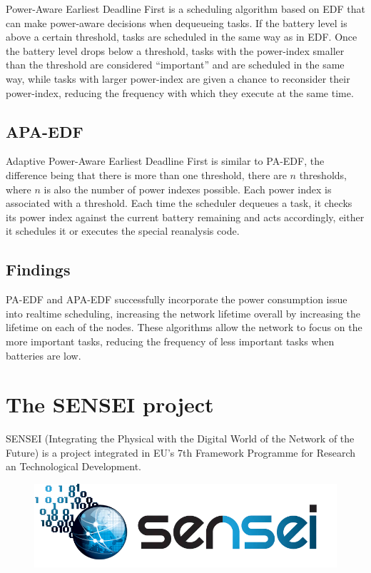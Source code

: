 Power-Aware Earliest Deadline First is a scheduling algorithm based on EDF that can make power-aware decisions when dequeueing tasks. If the battery level is above
a certain threshold, tasks are scheduled in the same way as in EDF. Once the battery level drops below a threshold, tasks with the power-index smaller than the 
threshold are considered ``important'' and are scheduled in the same way, while tasks with larger power-index are given a chance to reconsider their power-index,
reducing the frequency with which they execute at the same time.

\subsection{APA-EDF}

Adaptive Power-Aware Earliest Deadline First is similar to PA-EDF, the difference being that there is more than one threshold, there are $n$ thresholds, where $n$
is also the number of power indexes possible. Each power index is associated with a threshold. Each time the scheduler dequeues a task, it checks its power index
against the current battery remaining and acts accordingly, either it schedules it or executes the special reanalysis code.  

\subsection{Findings}

PA-EDF and APA-EDF successfully incorporate the power consumption issue into realtime scheduling, increasing the network lifetime overall by increasing the lifetime
on each of the nodes. These algorithms allow the network to focus on the more important tasks, reducing the frequency of less important tasks when batteries are low.


    
\section{The SENSEI project}

SENSEI (Integrating the Physical with the Digital World of the Network of the Future) is a project integrated in EU's 7th Framework Programme for Research
an Technological Development.

\begin{figure}[h]
 \begin{center}
  \includegraphics[scale=0.25]{wsan/sensei.png}
 \end{center}

\end{figure}


